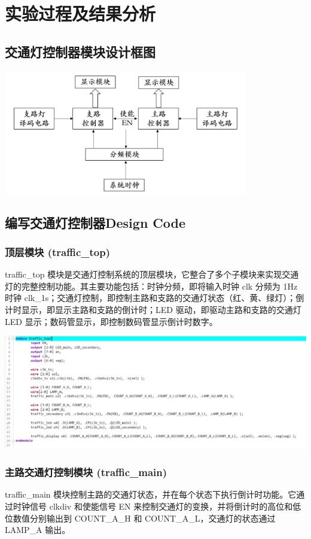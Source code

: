 \documentclass[a4,10pt,zihao=-4]{ctexart}
\begin{document}
\section{实验过程及结果分析}

\subsection{交通灯控制器模块设计框图}
\includegraphics[width=0.8\textwidth]{module_analze.png}

\subsection{编写交通灯控制器Design Code}
\subsubsection{顶层模块 (traffic\_top)}
traffic\_top 模块是交通灯控制系统的顶层模块，它整合了多个子模块来实现交通灯的完整控制功能。其主要功能包括：时钟分频，即将输入时钟 clk 分频为 1Hz 时钟 clk\_1s；交通灯控制，即控制主路和支路的交通灯状态（红、黄、绿灯）；倒计时显示，即显示主路和支路的倒计时；LED 驱动，即驱动主路和支路的交通灯 LED 显示；数码管显示，即控制数码管显示倒计时数字。

\vspace{1em}
\noindent\includegraphics[width=1\textwidth]{traffic_top_code.png}


\newpage
\subsubsection{主路交通灯控制模块 (traffic\_main)}
traffic\_main 模块控制主路的交通灯状态，并在每个状态下执行倒计时功能。它通过时钟信号 clkdiv 和使能信号 EN 来控制交通灯的变换，并将倒计时的高位和低位数值分别输出到 COUNT\_A\_H 和 COUNT\_A\_L，交通灯的状态通过 LAMP\_A 输出。
\end{document}
